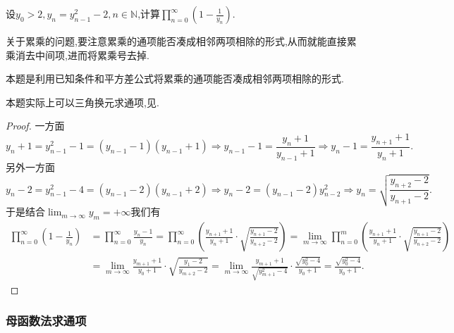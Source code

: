 \documentclass[../../main.tex]{subfiles}
\begin{document}
\begin{example}
设\(y_0>2,y_n=y_{n - 1}^{2}-2,n\in\mathbb{N}\),计算\(\prod_{n = 0}^{\infty}(1 - \frac{1}{y_n})\).  
\end{example}
\begin{note}
关于累乘的问题,要注意累乘的通项能否凑成相邻两项相除的形式,从而就能直接累乘消去中间项,进而将累乘号去掉.

本题是利用已知条件和平方差公式将累乘的通项能否凑成相邻两项相除的形式.
\end{note}
\begin{remark}
本题实际上可以三角换元求通项,见.
\end{remark}
\begin{proof}
一方面
\[
y_n + 1=y_{n - 1}^{2}-1=(y_{n - 1}-1)(y_{n - 1}+1)\Rightarrow y_{n - 1}-1=\frac{y_n + 1}{y_{n - 1}+1}\Rightarrow y_n - 1=\frac{y_{n + 1}+1}{y_n + 1}.
\]
另外一方面
\[
y_n - 2=y_{n - 1}^{2}-4=(y_{n - 1}-2)(y_{n - 1}+2)\Rightarrow y_n - 2=(y_{n - 1}-2)y_{n - 2}^{2}\Rightarrow y_n=\sqrt{\frac{y_{n + 2}-2}{y_{n + 1}-2}}.
\]
于是结合\(\lim_{m\rightarrow\infty}y_m = +\infty\)我们有
\begin{align*}
\prod_{n = 0}^{\infty}\left(1-\frac{1}{y_n}\right)&=\prod_{n=0}^{\infty}{\frac{y_n-1}{y_n}}=\prod_{n = 0}^{\infty}\left(\frac{y_{n + 1}+1}{y_n + 1}\cdot\sqrt{\frac{y_{n + 1}-2}{y_{n + 2}-2}}\right)
=\lim_{m\rightarrow\infty}\prod_{n = 0}^{m}\left(\frac{y_{n + 1}+1}{y_n + 1}\cdot\sqrt{\frac{y_{n + 1}-2}{y_{n + 2}-2}}\right)\\
&=\lim_{m\rightarrow\infty}\frac{y_{m + 1}+1}{y_0 + 1}\cdot\sqrt{\frac{y_1 - 2}{y_{m + 2}-2}}
=\lim_{m\rightarrow\infty}\frac{y_{m + 1}+1}{\sqrt{y_{m + 1}^{2}-4}}\cdot\frac{\sqrt{y_0^{2}-4}}{y_0 + 1}
=\frac{\sqrt{y_0^{2}-4}}{y_0 + 1}.
\end{align*}
\end{proof}





\subsubsection{母函数法求通项}
\end{document}
